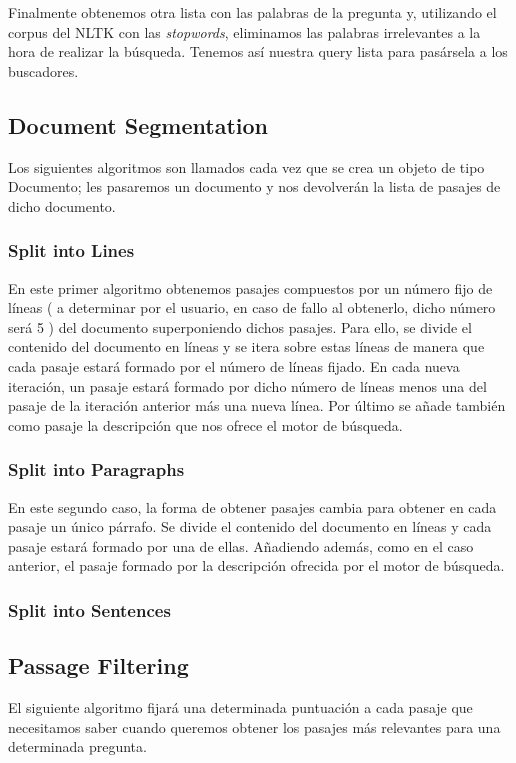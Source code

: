\documentclass[12pt,a4paper,titlepage]{article}
\begin{document}
Finalmente obtenemos otra lista con las palabras de la pregunta y, utilizando el corpus del NLTK con las \emph{stopwords}, eliminamos las palabras irrelevantes a la hora de realizar la búsqueda. Tenemos así nuestra query lista para pasársela a los buscadores.

\subsection{Document Segmentation}
Los siguientes algoritmos son llamados cada vez que se crea un objeto de tipo Documento; les pasaremos un documento y nos devolverán la lista de pasajes de dicho documento.

\subsubsection{Split into Lines}
En este primer algoritmo obtenemos pasajes compuestos por un número fijo de líneas ( a determinar por el usuario, en caso de fallo al obtenerlo, dicho número será 5 ) del documento superponiendo dichos pasajes. Para ello, se divide el contenido del documento en líneas y se itera sobre estas líneas de manera que cada pasaje estará formado por el número de líneas fijado. En cada nueva iteración, un pasaje estará formado por dicho número de líneas menos una del pasaje de la iteración anterior más una nueva línea. Por último se añade también como pasaje la descripción que nos ofrece el motor de búsqueda.

\subsubsection{Split into Paragraphs}
En este segundo caso, la forma de obtener pasajes cambia para obtener en cada pasaje un único párrafo. Se divide el contenido del documento en líneas y cada pasaje estará formado por una de ellas. Añadiendo además, como en el caso anterior, el pasaje formado por la descripción ofrecida por el motor de búsqueda.

\subsubsection{Split into Sentences}

\subsection{Passage Filtering}
El siguiente algoritmo fijará una determinada puntuación a cada pasaje que necesitamos saber cuando queremos obtener los pasajes más relevantes para una determinada pregunta.
\end{document}
